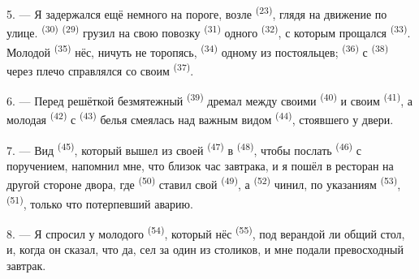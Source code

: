 5. --- Я задержался ещё немного на пороге, возле 
\textsuperscript{(23)}, глядя на движение по улице.  \textsuperscript{(30)}
 \textsuperscript{(29)} грузил на свою повозку 
\textsuperscript{(31)} одного  \textsuperscript{(32)}, с которым
прощался  \textsuperscript{(33)}. Молодой
 \textsuperscript{(35)} нёс, ничуть не торопясь,
 \textsuperscript{(34)} одному из постояльцев;
 \textsuperscript{(36)} с 
\textsuperscript{(38)} через плечо справлялся со своим 
\textsuperscript{(37)}.

\VUsaut{4.0mm}
\VUsaut{3.0mm}

6. --- Перед решёткой безмятежный  \textsuperscript{(39)}
дремал между своими  \textsuperscript{(40)} и своим
 \textsuperscript{(41)}, а молодая 
\textsuperscript{(42)} с  \textsuperscript{(43)} белья смеялась над
важным видом  \textsuperscript{(44)}, стоявшего у двери.

7. --- Вид  \textsuperscript{(45)}, который вышел из своей
 \textsuperscript{(47)} в  \textsuperscript{(48)}, чтобы
послать  \textsuperscript{(46)} с поручением, напомнил мне, что
близок час завтрака, и я пошёл в ресторан на другой стороне двора, где
 \textsuperscript{(50)} ставил свой 
\textsuperscript{(49)}, а  \textsuperscript{(52)} чинил, по указаниям
 \textsuperscript{(53)}, 
\textsuperscript{(51)}, только что потерпевший аварию.

8. --- Я спросил у молодого  \textsuperscript{(54)}, который нёс
 \textsuperscript{(55)}, под верандой ли общий стол, и, когда
он сказал, что да, сел за один из столиков, и мне подали превосходный
завтрак.


\VUsaut{4.0mm}
\VUsaut{3.0mm}

